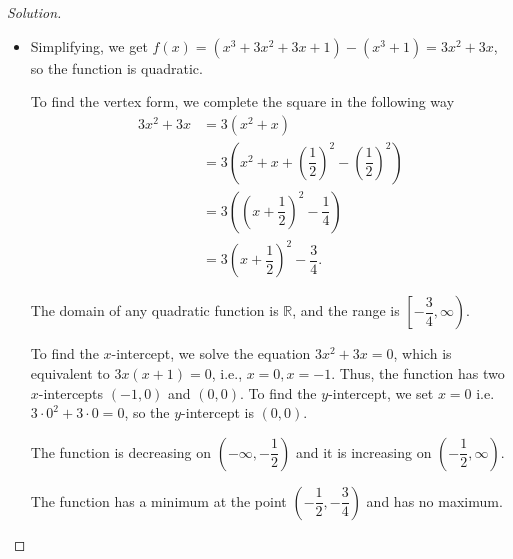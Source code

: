 \documentclass[12pt]{article}
\newenvironment{solution}{\begin{proof}[Solution]}{\end{proof}}
\begin{document}
\begin{enumerate}
\begin{solution}
\begin{itemize}
				\item[(e)] 
				Simplifying, we get $f(x)=(x^3+3x^2+3x+1)-(x^3+1)=3x^2+3x$, so the function is quadratic.
				
				To find the vertex form, we complete the square in the following way
				\begin{align*}
					3x^2+3x&=3(x^2+x)\\
					&=3(x^2+x+\left(\dfrac{1}{2}\right)^2-\left(\dfrac{1}{2}\right)^2)\\
					&=3(\left(x+\dfrac{1}{2}\right)^2-\dfrac{1}{4})\\
					&=3\left(x+\dfrac{1}{2}\right)^2-\dfrac{3}{4}.
				\end{align*}
				
				The domain of any quadratic function is $\mathbb{R}$, and the range is $\left[-\dfrac{3}{4},\infty \right).$
				
				To find the $x$-intercept, we solve the equation $3x^2+3x=0$, which is equivalent to $3x(x+1)=0$, i.e., $x=0, x=-1$. Thus, the function has two $x$-intercepts $(-1,0)$ and $(0,0)$. To find the $y$-intercept, we set $x=0$ i.e. $3\cdot0^2+3\cdot 0=0$, so the $y$-intercept is $(0,0)$.
				
				The function is decreasing on $(-\infty,-\dfrac{1}{2})$ and it is increasing on $(-\dfrac{1}{2},\infty)$.
				
				The function has a minimum at the point $\left(-\dfrac{1}{2},-\dfrac{3}{4}\right)$ and has no maximum.
				
\end{itemize}
\end{solution}
\end{enumerate}
\end{document}

